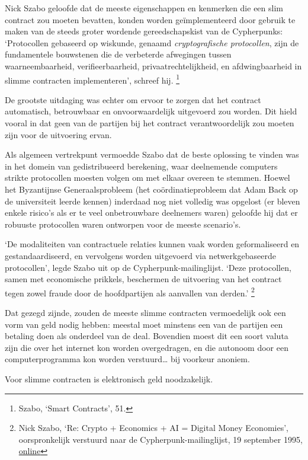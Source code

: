 \documentclass[smalldemyvopaper,11pt,twoside,onecolumn,openright,extrafontsizes,hidelinks]{memoir}
\begin{document}
Nick Szabo geloofde dat de meeste eigenschappen en kenmerken die een
slim contract zou moeten bevatten, konden worden geïmplementeerd door
gebruik te maken van de steeds groter wordende gereedschapskist van de
Cypherpunks: `Protocollen gebaseerd op wiskunde, genaamd
\emph{cryptografische protocollen}, zijn de fundamentele bouwstenen die
de verbeterde afwegingen tussen waarneembaarheid, verifieerbaarheid,
privaatrechtelijkheid, en afdwingbaarheid in slimme contracten
implementeren', schreef hij. \footnote{Szabo, `Smart Contracts', 51.}

De grootste uitdaging was echter om ervoor te zorgen dat het contract
automatisch, betrouwbaar en onvoorwaardelijk uitgevoerd zou worden. Dit
hield vooral in dat geen van de partijen bij het contract
verantwoordelijk zou moeten zijn voor de uitvoering ervan.

Als algemeen vertrekpunt vermoedde Szabo dat de beste oplossing te
vinden was in het domein van gedistribueerd berekening, waar deelnemende
computers strikte protocollen moesten volgen om met elkaar overeen te
stemmen. Hoewel het Byzantijnse Generaalsprobleem (het
coördinatieprobleem dat Adam Back op de universiteit leerde kennen)
inderdaad nog niet volledig was opgelost (er bleven enkele risico's als
er te veel onbetrouwbare deelnemers waren) geloofde hij dat er robuuste
protocollen waren ontworpen voor de meeste scenario's.

`De modaliteiten van contractuele relaties kunnen vaak worden
geformaliseerd en gestandaardiseerd, en vervolgens worden uitgevoerd via
netwerkgebaseerde protocollen', legde Szabo uit op de
Cypherpunk-mailinglijst. `Deze protocollen, samen met economische
prikkels, beschermen de uitvoering van het contract tegen zowel fraude
door de hoofdpartijen als aanvallen van derden.' \footnote{Nick Szabo,
  `Re: Crypto + Economics + AI = Digital Money Economies',
  oorspronkelijk verstuurd naar de Cypherpunk-mailinglijst, 19 september
  1995,
  \href{https://cypherpunks.venona.com/date/1995/09/msg01303.html}{online}}

Dat gezegd zijnde, zouden de meeste slimme contracten vermoedelijk ook
een vorm van geld nodig hebben: meestal moet minstens een van de
partijen een betaling doen als onderdeel van de deal. Bovendien moest
dit een soort valuta zijn die over het internet kon worden overgedragen,
en die autonoom door een computerprogramma kon worden verstuurd\ldots{}
bij voorkeur anoniem.

Voor slimme contracten is elektronisch geld noodzakelijk.
\end{document}

